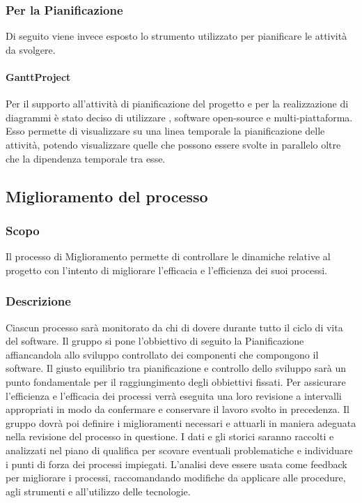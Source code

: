 \subsubsection{Per la Pianificazione}
Di seguito viene invece esposto lo strumento utilizzato per pianificare le attività da svolgere.
\paragraph{GanttProject}
Per il supporto all'attività di pianificazione del progetto e per la realizzazione di diagrammi è stato deciso di utilizzare , software open-source e multi-piattaforma. Esso permette di visualizzare su una linea temporale la pianificazione delle attività, potendo visualizzare quelle che possono essere svolte in parallelo oltre che la dipendenza temporale tra esse.

\subsection{Miglioramento del processo} \label{_miglioramentoDelProcesso}
\subsubsection{Scopo}
Il processo di Miglioramento permette di controllare le dinamiche relative al progetto con l'intento di migliorare l'efficacia e l'efficienza dei suoi processi.
\subsubsection{Descrizione}
Ciascun processo sarà monitorato da chi di dovere durante tutto il ciclo di vita del software. Il gruppo si pone l'obbiettivo di seguito la Pianificazione affiancandola allo sviluppo controllato dei componenti che compongono il software. Il giusto equilibrio tra pianificazione e controllo dello sviluppo sarà un punto fondamentale per il raggiungimento degli obbiettivi fissati. Per assicurare l'efficienza e l'efficacia dei processi verrà eseguita una loro revisione a intervalli appropriati in modo da confermare e conservare il lavoro svolto in precedenza. Il gruppo dovrà poi definire i miglioramenti necessari e attuarli in maniera adeguata nella revisione del processo in questione. I dati e gli storici saranno raccolti e analizzati nel piano di qualifica per scovare eventuali problematiche e individuare i punti di forza dei processi impiegati. L'analisi deve essere usata come feedback per migliorare i processi, raccomandando modifiche da applicare alle procedure, agli strumenti e all'utilizzo delle tecnologie.

